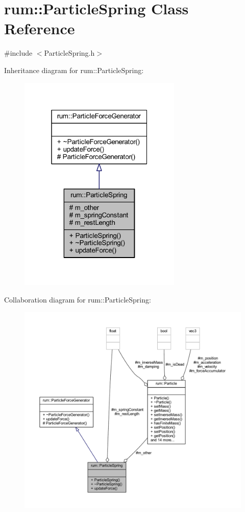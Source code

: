\hypertarget{classrum_1_1_particle_spring}{}\section{rum\+:\+:Particle\+Spring Class Reference}
\label{classrum_1_1_particle_spring}


{\ttfamily \#include $<$Particle\+Spring.\+h$>$}



Inheritance diagram for rum\+:\+:Particle\+Spring\+:\nopagebreak
\begin{figure}[H]
\begin{center}
\leavevmode
\includegraphics[width=220pt]{classrum_1_1_particle_spring__inherit__graph}
\end{center}
\end{figure}


Collaboration diagram for rum\+:\+:Particle\+Spring\+:\nopagebreak
\begin{figure}[H]
\begin{center}
\leavevmode
\includegraphics[width=350pt]{classrum_1_1_particle_spring__coll__graph}
\end{center}
\end{figure}
